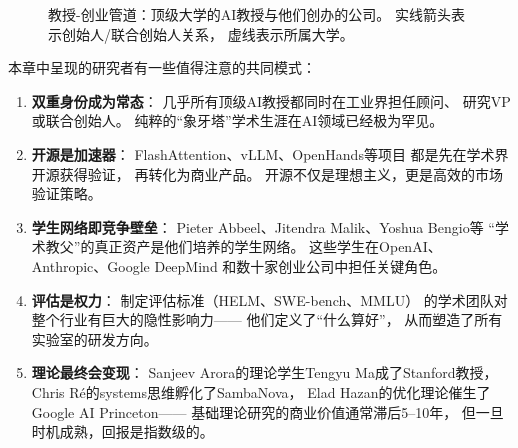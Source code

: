 \begin{figure}[htbp]
\caption{教授-创业管道：顶级大学的AI教授与他们创办的公司。
实线箭头表示创始人/联合创始人关系，
虚线表示所属大学。}
\label{fig:prof-startup}
\end{figure}

本章中呈现的研究者有一些值得注意的共同模式：

\begin{keybox}[五个关键观察]
\begin{enumerate}[noitemsep]
  \item \textbf{双重身份成为常态}：
        几乎所有顶级AI教授都同时在工业界担任顾问、
        研究VP或联合创始人。
        纯粹的``象牙塔''学术生涯在AI领域已经极为罕见。
  \item \textbf{开源是加速器}：
        FlashAttention、vLLM、OpenHands等项目
        都是先在学术界开源获得验证，
        再转化为商业产品。
        开源不仅是理想主义，更是高效的市场验证策略。
  \item \textbf{学生网络即竞争壁垒}：
        Pieter Abbeel、Jitendra Malik、Yoshua Bengio等
        ``学术教父''的真正资产是他们培养的学生网络。
        这些学生在OpenAI、Anthropic、Google DeepMind
        和数十家创业公司中担任关键角色。
  \item \textbf{评估是权力}：
        制定评估标准（HELM、SWE-bench、MMLU）
        的学术团队对整个行业有巨大的隐性影响力——
        他们定义了``什么算好''，
        从而塑造了所有实验室的研发方向。
  \item \textbf{理论最终会变现}：
        Sanjeev Arora的理论学生Tengyu Ma成了Stanford教授，
        Chris R\'{e}的systems思维孵化了SambaNova，
        Elad Hazan的优化理论催生了Google AI Princeton——
        基础理论研究的商业价值通常滞后5--10年，
        但一旦时机成熟，回报是指数级的。
\end{enumerate}
\end{keybox}

